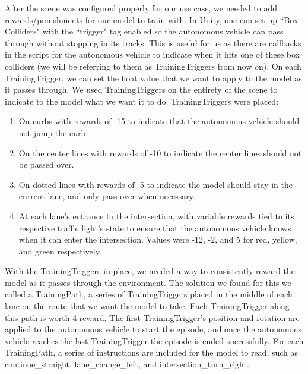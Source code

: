 \documentclass[conference]{IEEEtran}
\begin{document}
After the scene was configured properly for our use case, we needed to add rewards/punishments for our model to train with. In Unity, one can set up ``Box Colliders" with the ``trigger" tag enabled so the autonomous vehicle can pass through without stopping in its tracks. This is useful for us as there are callbacks in the script for the autonomous vehicle to indicate when it hits one of these box colliders (we will be referring to them as TrainingTriggers from now on). On each TrainingTrigger, we can set the float value that we want to apply to the model as it passes through. We used TrainingTriggers on the entirety of the scene to indicate to the model what we want it to do. TrainingTriggers were placed:
\begin{enumerate}
    \item On curbs with rewards of -15 to indicate that the autonomous vehicle should not jump the curb.
    \item On the center lines with rewards of -10 to indicate the center lines should not be passed over.
    \item On dotted lines with rewards of -5 to indicate the model should stay in the current lane, and only pass over when necessary.
    \item At each lane's entrance to the intersection, with variable rewards tied to its respective traffic light's state to ensure that the autonomous vehicle knows when it can enter the intersection. Values were -12, -2, and 5 for red, yellow, and green respectively.
\end{enumerate}\par
With the TrainingTriggers in place, we needed a way to consistently reward the model as it passes through the environment. The solution we found for this we called a TrainingPath, a series of TrainingTriggers placed in the middle of each lane on the route that we want the model to take. Each TrainingTrigger along this path is worth 4 reward. The first TrainingTrigger's position and rotation are applied to the autonomous vehicle to start the episode, and once the autonomous vehicle reaches the last TrainingTrigger the episode is ended successfully. For each TrainingPath, a series of instructions are included for the model to read, such as continue\_straight, lane\_change\_left, and intersection\_turn\_right.
\end{document}
